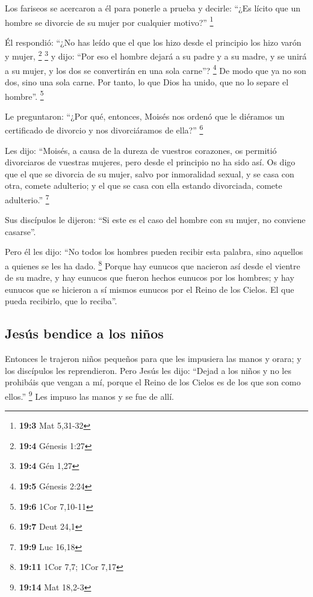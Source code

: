  Los fariseos se acercaron a él para ponerle a prueba y
decirle: ``¿Es lícito que un hombre se divorcie de su mujer por
cualquier motivo?'' \footnote{\textbf{19:3} Mat 5,31-32}

 Él respondió: ``¿No has leído que el que los hizo desde
el principio los hizo varón y mujer, \footnote{\textbf{19:4} Génesis
  1:27} \footnote{\textbf{19:4} Gén 1,27}  y dijo: ``Por
eso el hombre dejará a su padre y a su madre, y se unirá a su mujer, y
los dos se convertirán en una sola carne''? \footnote{\textbf{19:5}
  Génesis 2:24}  De modo que ya no son dos, sino una sola
carne. Por tanto, lo que Dios ha unido, que no lo separe el hombre''.
\footnote{\textbf{19:6} 1Cor 7,10-11}

 Le preguntaron: ``¿Por qué, entonces, Moisés nos ordenó
que le diéramos un certificado de divorcio y nos divorciáramos de
ella?'' \footnote{\textbf{19:7} Deut 24,1}

 Les dijo: ``Moisés, a causa de la dureza de vuestros
corazones, os permitió divorciaros de vuestras mujeres, pero desde el
principio no ha sido así.  Os digo que el que se divorcia
de su mujer, salvo por inmoralidad sexual, y se casa con otra, comete
adulterio; y el que se casa con ella estando divorciada, comete
adulterio.'' \footnote{\textbf{19:9} Luc 16,18}

 Sus discípulos le dijeron: ``Si este es el caso del
hombre con su mujer, no conviene casarse''.

 Pero él les dijo: ``No todos los hombres pueden recibir
esta palabra, sino aquellos a quienes se les ha dado. \footnote{\textbf{19:11}
  1Cor 7,7; 1Cor 7,17}  Porque hay eunucos que nacieron
así desde el vientre de su madre, y hay eunucos que fueron hechos
eunucos por los hombres; y hay eunucos que se hicieron a sí mismos
eunucos por el Reino de los Cielos. El que pueda recibirlo, que lo
reciba''.

\hypertarget{jesuxfas-bendice-a-los-niuxf1os}{%
\subsection{Jesús bendice a los
niños}\label{jesuxfas-bendice-a-los-niuxf1os}}

 Entonces le trajeron niños pequeños para que les
impusiera las manos y orara; y los discípulos les reprendieron.
 Pero Jesús les dijo: ``Dejad a los niños y no les
prohibáis que vengan a mí, porque el Reino de los Cielos es de los que
son como ellos.'' \footnote{\textbf{19:14} Mat 18,2-3} 
Les impuso las manos y se fue de allí.

